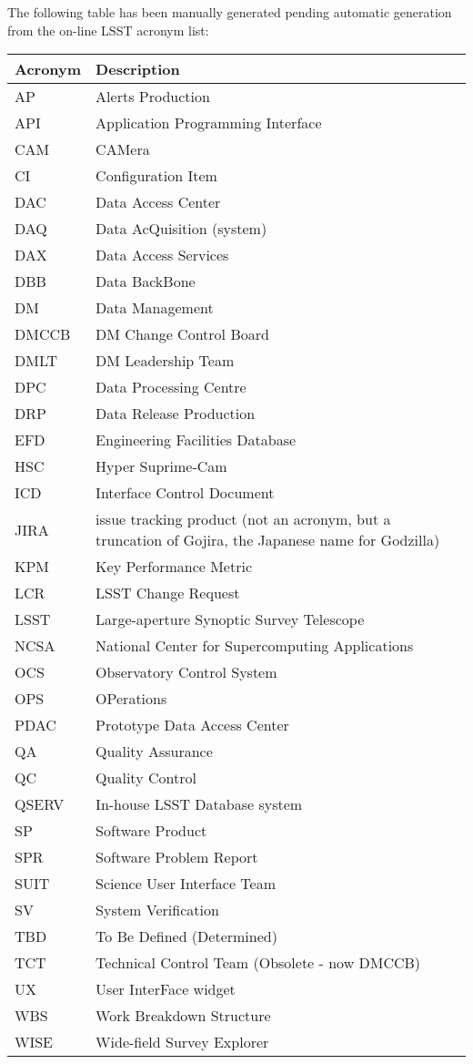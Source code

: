 The following table has been manually generated pending automatic generation from the on-line LSST acronym list:
\newline\newline%
\addtocounter{table}{-1}
\begin{longtable}{|l|p{}|}\hline
\textbf{Acronym} & \textbf{Description}  \\\hline
AP&Alerts Production \\\hline
API&Application Programming Interface \\\hline
CAM&CAMera \\\hline
CI&Configuration Item \\\hline
DAC&Data Access Center \\\hline
DAQ&Data AcQuisition (system) \\\hline
DAX&Data Access Services \\\hline
DBB&Data BackBone \\\hline
DM&Data Management \\\hline
DMCCB&DM Change Control Board \\\hline
DMLT&DM Leadership Team \\\hline
DPC&Data Processing Centre \\\hline
DRP&Data Release Production \\\hline
EFD&Engineering Facilities Database \\\hline
HSC&Hyper Suprime-Cam \\\hline
ICD&Interface Control Document \\\hline
JIRA&issue tracking product (not an acronym, but a truncation of Gojira, the Japanese name for Godzilla) \\\hline
KPM&Key Performance Metric \\\hline
LCR&LSST Change Request \\\hline
LSST&Large-aperture Synoptic Survey Telescope \\\hline
NCSA&National Center for Supercomputing Applications \\\hline
OCS&Observatory Control System \\\hline
OPS&OPerations \\\hline
PDAC&Prototype Data Access Center \\\hline
QA&Quality Assurance \\\hline
QC&Quality Control \\\hline
QSERV&In-house LSST Database system \\\hline
SP&Software Product \\\hline
SPR&Software Problem Report \\\hline
SUIT&Science User Interface Team \\\hline
SV&System Verification \\\hline
TBD&To Be Defined (Determined) \\\hline
TCT&Technical Control Team (Obsolete - now DMCCB) \\\hline
UX&User InterFace widget \\\hline
WBS&Work Breakdown Structure \\\hline
WISE&Wide-field Survey Explorer \\\hline
\end{longtable}

